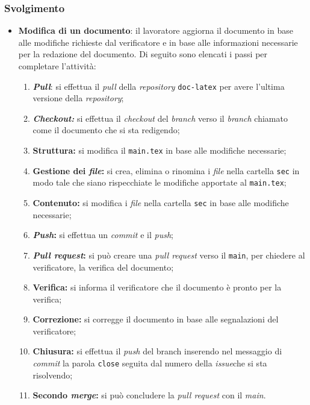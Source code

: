 \subsubsection*{Svolgimento}
\begin{itemize}
	\item \textbf{Modifica di un documento}: il lavoratore aggiorna il documento in base alle modifiche richieste dal verificatore e in base alle informazioni necessarie per la redazione del documento. 
		Di seguito sono elencati i passi per completare l'attività:
		\begin{enumerate}
			\item \textbf{\textit{Pull}}: si effettua il \textit{pull} della \textit{repository\g} \texttt{doc-latex} per avere l'ultima versione della \textit{repository\g};
			\item \textbf{\textit{Checkout:}} si effettua il \textit{checkout} del \textit{branch} verso il \textit{branch} chiamato come il documento che si sta redigendo;
			\item \textbf{Struttura:} si modifica il \texttt{main.tex} in base alle modifiche necessarie;
			\item \textbf{Gestione dei \textit{file}:} si crea, elimina o rinomina i \textit{file} nella cartella \texttt{sec} in modo tale che siano rispecchiate le modifiche apportate al \texttt{main.tex};
			\item \textbf{Contenuto:} si modifica i \textit{file} nella cartella \texttt{sec} in base alle modifiche necessarie;
			\item \textbf{\textit{Push}:} si effettua un \textit{commit} e il \textit{push};
			\item \textbf{\textit{Pull request}:} si può creare una \textit{pull request} verso il \texttt{main}, per chiedere al verificatore, la verifica del documento;
			\item \textbf{Verifica:} si informa il verificatore che il documento è pronto per la verifica;
			\item \textbf{Correzione:} si corregge il documento in base alle segnalazioni del verificatore;
			\item \textbf{Chiusura:} si effettua il \textit{push} del branch inserendo nel messaggio di \textit{commit} la parola \texttt{close} seguita dal numero della \textit{issue}\g che si sta risolvendo;
			\item \textbf{Secondo \textit{merge}:} si può concludere la \textit{pull request} con il \textit{main}.
		\end{enumerate}
\end{itemize}


